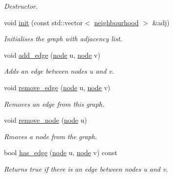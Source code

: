 \begin{DoxyCompactItemize}
\begin{DoxyCompactList}\small\item\em Destructor. \end{DoxyCompactList}\item 
void \hyperlink{classlgraph_1_1uugraph_ac1b10f02bd4af867af6fa71d95ca08c9}{init} (const std\-::vector$<$ \hyperlink{namespacelgraph_a052e7766c13f3a43cec0aec8173fdede}{neighbourhood} $>$ \&adj)
\begin{DoxyCompactList}\small\item\em Initialises the graph with adjacency list. \end{DoxyCompactList}\item 
void \hyperlink{classlgraph_1_1uugraph_aab99d94a39626616f99b81e5cdbe1ebd}{add\-\_\-edge} (\hyperlink{namespacelgraph_a397169dd66adf725210a30fb7251773e}{node} u, \hyperlink{namespacelgraph_a397169dd66adf725210a30fb7251773e}{node} v)
\begin{DoxyCompactList}\small\item\em Adds an edge between nodes {\itshape u} and {\itshape v}. \end{DoxyCompactList}\item 
void \hyperlink{classlgraph_1_1uugraph_ae38adf44fd8f44d7f940710a0f8f3b35}{remove\-\_\-edge} (\hyperlink{namespacelgraph_a397169dd66adf725210a30fb7251773e}{node} u, \hyperlink{namespacelgraph_a397169dd66adf725210a30fb7251773e}{node} v)
\begin{DoxyCompactList}\small\item\em Removes an edge from this graph. \end{DoxyCompactList}\item 
void \hyperlink{classlgraph_1_1uugraph_aa7f32c48d008edaa4992eb72a176e806}{remove\-\_\-node} (\hyperlink{namespacelgraph_a397169dd66adf725210a30fb7251773e}{node} u)
\begin{DoxyCompactList}\small\item\em Rmoves a node from the graph. \end{DoxyCompactList}\item 
bool \hyperlink{classlgraph_1_1uugraph_adacdf05c7f535ed9b29578c509566411}{has\-\_\-edge} (\hyperlink{namespacelgraph_a397169dd66adf725210a30fb7251773e}{node} u, \hyperlink{namespacelgraph_a397169dd66adf725210a30fb7251773e}{node} v) const 
\begin{DoxyCompactList}\small\item\em Returns true if there is an edge between nodes {\itshape u} and {\itshape v}. \end{DoxyCompactList}\item 

\end{DoxyCompactItemize}

